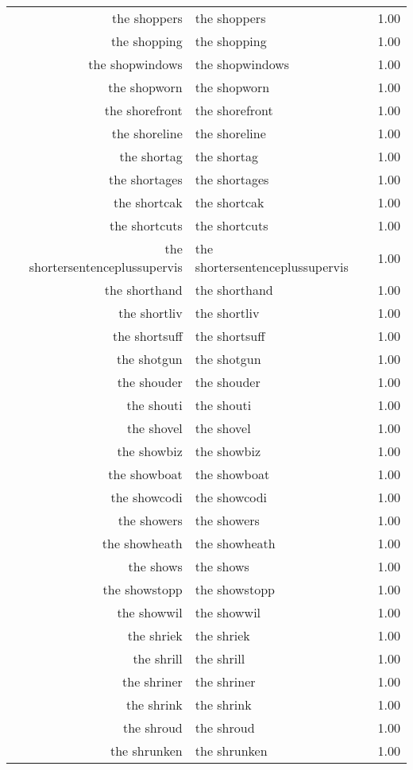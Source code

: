 \begin{table}[ht]
\begin{tabular}{rlr}
  the shoppers & the shoppers & 1.00 \\ 
  the shopping & the shopping & 1.00 \\ 
  the shopwindows & the shopwindows & 1.00 \\ 
  the shopworn & the shopworn & 1.00 \\ 
  the shorefront & the shorefront & 1.00 \\ 
  the shoreline & the shoreline & 1.00 \\ 
  the shortag & the shortag & 1.00 \\ 
  the shortages & the shortages & 1.00 \\ 
  the shortcak & the shortcak & 1.00 \\ 
  the shortcuts & the shortcuts & 1.00 \\ 
  the shortersentenceplussupervis & the shortersentenceplussupervis & 1.00 \\ 
  the shorthand & the shorthand & 1.00 \\ 
  the shortliv & the shortliv & 1.00 \\ 
  the shortsuff & the shortsuff & 1.00 \\ 
  the shotgun & the shotgun & 1.00 \\ 
  the shouder & the shouder & 1.00 \\ 
  the shouti & the shouti & 1.00 \\ 
  the shovel & the shovel & 1.00 \\ 
  the showbiz & the showbiz & 1.00 \\ 
  the showboat & the showboat & 1.00 \\ 
  the showcodi & the showcodi & 1.00 \\ 
  the showers & the showers & 1.00 \\ 
  the showheath & the showheath & 1.00 \\ 
  the shows & the shows & 1.00 \\ 
  the showstopp & the showstopp & 1.00 \\ 
  the showwil & the showwil & 1.00 \\ 
  the shriek & the shriek & 1.00 \\ 
  the shrill & the shrill & 1.00 \\ 
  the shriner & the shriner & 1.00 \\ 
  the shrink & the shrink & 1.00 \\ 
  the shroud & the shroud & 1.00 \\ 
  the shrunken & the shrunken & 1.00 \\ 

\end{tabular}
\end{table}
